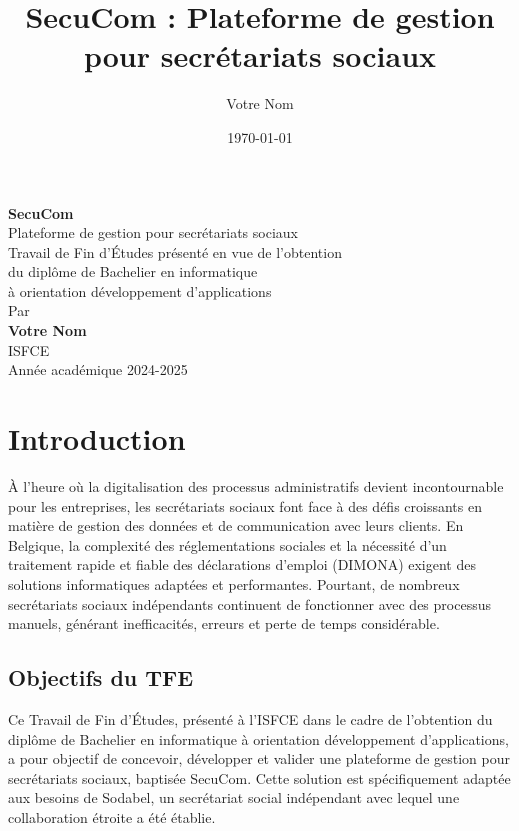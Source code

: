 \documentclass[12pt,a4paper]{report}
\title{SecuCom : Plateforme de gestion pour secrétariats sociaux}
\author{Votre Nom}
\date{\today}
\begin{document}
\begin{titlepage}
\begin{center}
\vspace*{2cm}
{\Huge\bfseries SecuCom\\}
\vspace{1.5cm}
{\Large Plateforme de gestion pour secrétariats sociaux\\}
\vspace{1cm}
{\large Travail de Fin d'Études présenté en vue de l'obtention\\du diplôme de Bachelier en informatique\\à orientation développement d'applications\\}
\vspace{1cm}
{\large Par\\}
\vspace{0.5cm}
{\large\bfseries Votre Nom\\}
\vspace{1cm}
{\large ISFCE\\}
\vspace{0.5cm}
{\large Année académique 2024-2025\\}
\end{center}
\end{titlepage}

\tableofcontents
\newpage

\chapter{Introduction}

À l'heure où la digitalisation des processus administratifs devient incontournable pour les entreprises, les secrétariats sociaux font face à des défis croissants en matière de gestion des données et de communication avec leurs clients. En Belgique, la complexité des réglementations sociales et la nécessité d'un traitement rapide et fiable des déclarations d'emploi (DIMONA) exigent des solutions informatiques adaptées et performantes. Pourtant, de nombreux secrétariats sociaux indépendants continuent de fonctionner avec des processus manuels, générant inefficacités, erreurs et perte de temps considérable.

\section{Objectifs du TFE}

Ce Travail de Fin d'Études, présenté à l'ISFCE dans le cadre de l'obtention du diplôme de Bachelier en informatique à orientation développement d'applications, a pour objectif de concevoir, développer et valider une plateforme de gestion pour secrétariats sociaux, baptisée SecuCom. Cette solution est spécifiquement adaptée aux besoins de Sodabel, un secrétariat social indépendant avec lequel une collaboration étroite a été établie.
\end{document}

